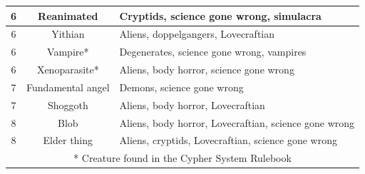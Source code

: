 \begin{longtable}{|c|c|p{10cm}|}
6 & Reanimated & Cryptids, science gone wrong, simulacra \\ \hline
6 & Yithian & Aliens, doppelgangers, Lovecraftian \\ \hline
6 & Vampire* & Degenerates, science gone wrong, vampires \\ \hline
6 & Xenoparasite* & Aliens, body horror, science gone wrong \\ \hline
7 & Fundamental angel & Demons, science gone wrong \\ \hline
7 & Shoggoth & Aliens, body horror, Lovecraftian \\ \hline
8 & Blob & Aliens, body horror, Lovecraftian, science gone wrong \\ \hline
8 & Elder thing & Aliens, cryptids, Lovecraftian, science gone wrong \\ \hline
\multicolumn{3}{|c|}{* Creature found in the Cypher System Rulebook} \\ \hline
\end{longtable}

